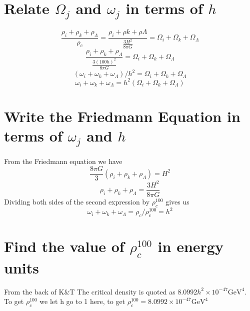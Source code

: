 \documentclass[12pt]{article}
\begin{document}
\section{Relate $\Omega_{j}$ and $\omega_{j}$ in terms of $h$}
$$ \frac{\rho_{i} + \rho_{k} + \rho_{\Lambda}} {\rho_{c}} =  \frac{\rho_{i} + \rho{k} + \rho{\Lambda}}{\frac{3H^{2}}{8\pi G}} = \Omega_{i} + \Omega_{k} + \Omega_{\Lambda}$$
$$ \frac{\rho_{i} + \rho_{k} + \rho_{\Lambda}}{\frac{3(100 h)^{2}}{8\pi G}} = \Omega_{i} + \Omega_{k} + \Omega_{\Lambda} $$
$$ (\omega_{i} + \omega_{k} + \omega_{\Lambda})/h^{2} =  \Omega_{i} + \Omega_{k} + \Omega_{\Lambda} $$
$$ \omega_{i} + \omega_{k} + \omega_{\Lambda} = h^{2}( \Omega_{i} + \Omega_{k} + \Omega_{\Lambda}) $$

\section{Write the Friedmann Equation in terms of $\omega_{j}$ and $h$}
From the Friedmann equation we have
$$ \frac{8\pi G}{3}( \rho_{i} + \rho_{k} + \rho_{\Lambda}) = H^{2}$$
$$\rho_{i} + \rho_{k} + \rho_{\Lambda} = \frac{3H^{2}}{8\pi G}$$
Dividing both sides of the second expression by $\rho^{100}_{c}$ gives us
$$\omega_{i} + \omega_{k} + \omega_{\Lambda} = \rho_{c} / \rho^{100}_{c} = h^{2}$$

\section{Find the value of $\rho^{100}_{c}$ in energy units}
From the back of K\&T The critical density is quoted as $8.0992h^{2} \times 10^{-47} \mathrm{GeV}^{4}$. To get $\rho^{100}_{c}$ we let h go to 1 here, to get
$\rho^{100}_{c} = 8.0992 \times 10^{-47} \mathrm{GeV}^{4}$
\end{document}

